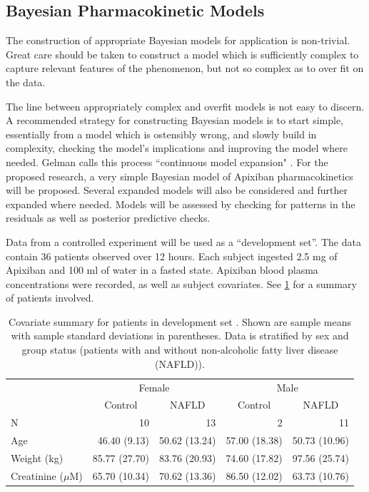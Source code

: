 \subsection{Bayesian Pharmacokinetic Models}

The construction of appropriate Bayesian models for application is non-trivial.  Great care should be taken to construct a model which is sufficiently complex to capture relevant features of the phenomenon, but not so complex as to over fit on the data. 

 The line between appropriately complex and overfit models is not easy to discern.  A recommended strategy for constructing Bayesian models is to start simple, essentially from a model which is ostensibly wrong, and slowly build in complexity, checking the model's implications and improving the model where needed.  Gelman calls this process ``continuous model expansion" \cite{gelman2013bayesian, gelman2013philosophy}.  For the proposed research, a very simple Bayesian model of Apixiban pharmacokinetics will be proposed.  Several expanded models will also be considered and further expanded where needed. Models will be assessed by checking for patterns in the residuals as well as posterior predictive checks.

Data from a controlled experiment \cite{tirona2018apixaban} will be used as a ``development set''.  The data contain 36 patients observed over 12 hours. Each subject ingested 2.5 mg of Apixiban and 100 ml of water in a fasted state. Apixiban blood plasma concentrations were recorded, as well as subject covariates.  See \cref{devsettable} for a summary of patients involved.

\begin{table}[t!]
	\centering
\begin{tabular}{lrrrr}
	\toprule
	\multicolumn{1}{c}{ } & \multicolumn{2}{c}{Female} & \multicolumn{2}{c}{Male} \\
	\cmidrule(l{2pt}r{2pt}){2-3} \cmidrule(l{2pt}r{2pt}){4-5}
	& \multicolumn{1}{c}{Control } & \multicolumn{1}{c}{ NAFLD}  & \multicolumn{1}{c}{ Control}  & \multicolumn{1}{c}{NAFLD } \\
	\midrule
	N & 10 & 13 & 2 & 11\\
	Age  & 46.40 (9.13) & 50.62 (13.24) & 57.00 (18.38) & 50.73 (10.96)\\
	Weight (kg)& 85.77 (27.70) & 83.76 (20.93) & 74.60 (17.82) & 97.56 (25.74)\\
	Creatinine ($\mu$M)& 65.70 (10.34) & 70.62 (13.36) & 86.50 (12.02) & 63.73 (10.76)\\
	\bottomrule
\end{tabular}

\caption[Summary of development data set]{Covariate summary for patients in development set \cite{tirona2018apixaban}.  Shown are sample means with sample standard deviations in parentheses.  Data is stratified by sex and group status (patients with and without non-alcoholic fatty liver disease (NAFLD)).}
\label{devsettable}

\end{table}

